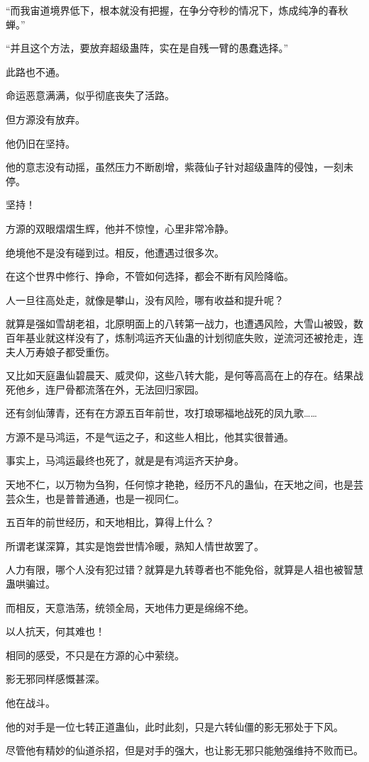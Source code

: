 \begin{this_body}
“而我宙道境界低下，根本就没有把握，在争分夺秒的情况下，炼成纯净的春秋蝉。”

“并且这个方法，要放弃超级蛊阵，实在是自残一臂的愚蠢选择。”

此路也不通。

命运恶意满满，似乎彻底丧失了活路。

但方源没有放弃。

他仍旧在坚持。

他的意志没有动摇，虽然压力不断剧增，紫薇仙子针对超级蛊阵的侵蚀，一刻未停。

坚持！

方源的双眼熠熠生辉，他并不惊惶，心里非常冷静。

绝境他不是没有碰到过。相反，他遭遇过很多次。

在这个世界中修行、挣命，不管如何选择，都会不断有风险降临。

人一旦往高处走，就像是攀山，没有风险，哪有收益和提升呢？

就算是强如雪胡老祖，北原明面上的八转第一战力，也遭遇风险，大雪山被毁，数百年基业就这样没有了，炼制鸿运齐天仙蛊的计划彻底失败，逆流河还被抢走，连夫人万寿娘子都受重伤。

又比如天庭蛊仙碧晨天、威灵仰，这些八转大能，是何等高高在上的存在。结果战死他乡，连尸骨都流落在外，无法回归家园。

还有剑仙薄青，还有在方源五百年前世，攻打琅琊福地战死的凤九歌……

方源不是马鸿运，不是气运之子，和这些人相比，他其实很普通。

事实上，马鸿运最终也死了，就是是有鸿运齐天护身。

天地不仁，以万物为刍狗，任何惊才艳艳，经历不凡的蛊仙，在天地之间，也是芸芸众生，也是普普通通，也是一视同仁。

五百年的前世经历，和天地相比，算得上什么？

所谓老谋深算，其实是饱尝世情冷暖，熟知人情世故罢了。

人力有限，哪个人没有犯过错？就算是九转尊者也不能免俗，就算是人祖也被智慧蛊哄骗过。

而相反，天意浩荡，统领全局，天地伟力更是绵绵不绝。

以人抗天，何其难也！

相同的感受，不只是在方源的心中萦绕。

影无邪同样感慨甚深。

他在战斗。

他的对手是一位七转正道蛊仙，此时此刻，只是六转仙僵的影无邪处于下风。

尽管他有精妙的仙道杀招，但是对手的强大，也让影无邪只能勉强维持不败而已。


\end{this_body}
